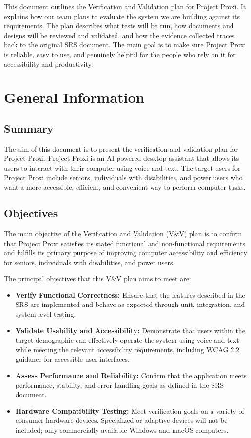 \documentclass[12pt, titlepage]{article}
\begin{document}
\newpage


\noindent This document outlines the Verification and Validation plan for
Project Proxi. It explains how our team plans to evaluate the system we are
building against its requirements. The plan describes what tests will be
run, how documents and designs will be reviewed and validated, and how the
evidence collected traces back to the original SRS document. The main goal
is to make sure Project Proxi is reliable, easy to use, and genuinely
helpful for the people who rely on it for accessibility and productivity.

\section{General Information}

\subsection{Summary}
The aim of this document is to present the verification and validation
plan for Project Proxi. Project Proxi is an AI-powered desktop assistant
that allows its users to interact with their computer using voice and
text. The target users for Project Proxi include seniors, individuals
with disabilities, and power users who want a more accessible,
efficient, and convenient way to perform computer tasks.

\subsection{Objectives}
The main objective of the Verification and Validation (V\&V) plan is to
confirm that Project Proxi satisfies its stated functional and
non-functional requirements and fulfills its primary purpose of improving
computer accessibility and efficiency for seniors, individuals with
disabilities, and power users.

\noindent The principal objectives that this V\&V plan aims to meet are:
\begin{itemize}
  \item \textbf{Verify Functional Correctness:} Ensure that the features
  described in the SRS are implemented and behave as expected through
  unit, integration, and system-level testing.
  \item \textbf{Validate Usability and Accessibility:} Demonstrate that
  users within the target demographic can effectively operate the system
  using voice and text while meeting the relevant accessibility
  requirements, including WCAG 2.2 guidance for accessible user
  interfaces.
  \item \textbf{Assess Performance and Reliability:} Confirm that the
  application meets performance, stability, and error-handling goals as
  defined in the SRS document.
  \item \textbf{Hardware Compatibility Testing:} Meet verification goals
  on a variety of consumer hardware devices. Specialized or adaptive
  devices will not be included; only commercially available Windows and
  macOS computers.
\end{itemize}
\end{document}
